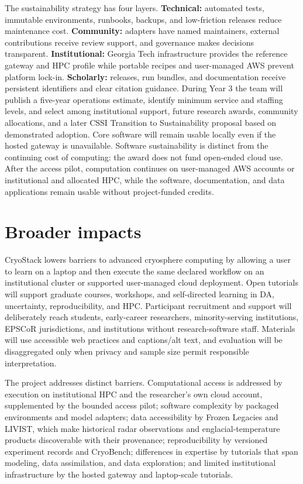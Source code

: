 The sustainability strategy has four layers. \textbf{Technical:} automated
tests, immutable environments, runbooks, backups, and low-friction releases
reduce maintenance cost. \textbf{Community:} adapters have named maintainers,
external contributions receive review support, and governance makes decisions
transparent. \textbf{Institutional:} Georgia Tech infrastructure provides the
reference gateway and HPC profile while portable recipes and user-managed AWS
prevent platform lock-in. \textbf{Scholarly:} releases, run
bundles, and documentation receive persistent identifiers and clear citation
guidance. During Year 3 the team will publish a five-year operations estimate,
identify minimum service and staffing levels, and select among institutional
support, future research awards, community allocations, and a later CSSI
Transition to Sustainability proposal based on demonstrated adoption. Core
software will remain usable locally even if the hosted gateway is unavailable.
Software sustainability is distinct from the continuing cost of computing: the
award does not fund open-ended cloud use. After the access pilot, computation
continues on user-managed AWS accounts or institutional and allocated HPC,
while the software, documentation, and data applications remain usable without
project-funded credits.

\section{Broader impacts}

CryoStack lowers barriers to advanced cryosphere computing by allowing a user
to learn on a laptop and then execute the same declared workflow on an
institutional cluster or supported user-managed cloud
deployment. Open tutorials will support graduate courses, workshops,
and self-directed learning in DA, uncertainty, reproducibility, and HPC.
Participant recruitment and support will deliberately reach students,
early-career researchers, minority-serving institutions, EPSCoR jurisdictions,
and institutions without research-software staff. Materials will use accessible
web practices and captions/alt text, and evaluation will be disaggregated only
when privacy and sample size permit responsible interpretation.

The project addresses distinct barriers. Computational access is addressed by
execution on institutional HPC and the researcher's own cloud account,
supplemented by the bounded access pilot; software complexity by packaged
environments and model adapters; data accessibility by Frozen Legacies and
LIVIST, which make historical radar observations and englacial-temperature
products discoverable with their provenance; reproducibility by versioned
experiment records and CryoBench; differences in expertise by tutorials that
span modeling, data assimilation, and data exploration; and limited
institutional infrastructure by the hosted gateway and laptop-scale tutorials.

